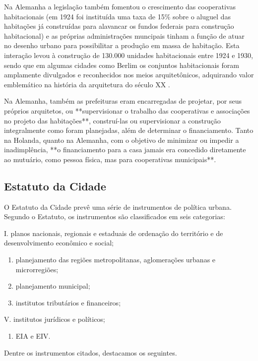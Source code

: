 \documentclass[
	12pt,				%
	oneside,			%
	a4paper,			%
	chapter=TITLE,		%
	section=TITLE,		%
	english,			%
	brazil				%
	]{abntex2}
\begin{document}
\begin{refsection}
Na Alemanha a legislação também fomentou o crescimento das cooperativas
habitacionais (em 1924 foi instituída uma taxa de 15\% sobre o aluguel das
habitações já construídas para alavancar os fundos federais para construção
habitacional) e as próprias administrações muncipais tinham a função de atuar no
desenho urbano para possibilitar a produção em massa de habitação. Esta
interação levou à construção de 130.000 unidades habitacionais entre 1924 e
1930, sendo que em algumas cidades como Berlim os conjuntos habitacionais foram
amplamente divulgados e reconhecidos nos meios arquitetônicos, adquirando valor
emblemático na história da arquitetura do século XX \autocite[90]{poleto}.
\begin{citacao}
Na Alemanha, também as prefeituras eram encarregadas de projetar, por 
seus próprios arquitetos, ou **supervisionar o trabalho das cooperativas e 
associações no projeto das habitações**, construí-las ou supervisionar a 
construção integralmente como foram planejadas, além de determinar o 
financiamento.
Tanto na Holanda, quanto na Alemanha, com o objetivo de minimizar ou 
impedir a inadimplência, **o financiamento para a casa jamais era concedido 
diretamente ao mutuário, como pessoa física, mas para cooperativas municipais**.
\cite[p.~317-318]{poleto}
\end{citacao}
\hypertarget{estatuto-da-cidade}{%
\subsection{Estatuto da Cidade}\label{estatuto-da-cidade}}

O Estatuto da Cidade \autocite{cidade} prevê uma série de instrumentos de política
urbana. Segundo o Estatuto, os instrumentos são classificados em seis
categorias:

I. planos nacionais, regionais e estaduais de ordenação do território e de
desenvolvimento econômico e social;
\begin{enumerate}
\def\labelenumi{\Roman{enumi}.}
\setcounter{enumi}{1}
\item
  planejamento das regiões metropolitanas, aglomerações urbanas e
  microrregiões;
\item
  planejamento municipal;
\item
  institutos tributários e financeiros;
\end{enumerate}
V. institutos jurídicos e políticos;
\begin{enumerate}
\def\labelenumi{\Roman{enumi}.}
\setcounter{enumi}{5}
\tightlist
\item
  \gls{EIA} e \gls{EIV}.
\end{enumerate}
Dentre os instrumentos citados, destacamos os seguintes.


\end{refsection}
\end{document}
